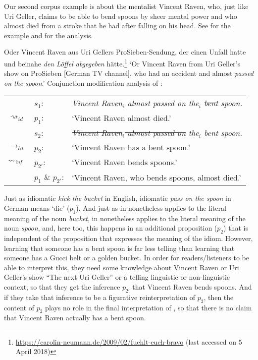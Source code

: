 \documentclass[output=paper]{langsci/langscibook}
\begin{document}
Our second corpus example is about the mentalist Vincent Raven, who, just like Uri Geller, claims to be able to bend spoons by sheer mental power and who almost died from a stroke that he had after falling on his head. See  for the example and  for the analysis.

\ea \label{bent spoon}
Oder Vincent Raven aus Uri Gellers ProSieben-Sendung, der einen Unfall hatte und beinahe \textit{den} \underline{} \textit{Löffel abgegeben} hätte.\footnote{\url{https://carolin-neumann.de/2009/02/fuehlt-euch-bravo} (last accessed on 5 April 2018)}
\glt `Or Vincent Raven from Uri Geller's show on ProSieben [German TV channel], who had an accident and almost \textit{passed on the} \underline{} \textit{spoon}.'
\ex \label{analysis bent spoon} 
Conjunction modification analysis of :\smallskip\\
\begin{tabularx}{\linewidth}[t]{@{}llQ@{}}
 & 	$s_{1}$: &  \textit{Vincent Raven$_{i}$ almost passed on the$_{i}$ \sout{bent} spoon.} \\
$\rightsquigarrow_{id}$	&	$p_{1}$: &  `Vincent Raven almost died.' \medskip\\
& 	$s_{2}$: &  \textit{\sout{Vincent Raven$_{i}$ almost passed on} the$_{i}$ bent spoon.} \\
$\rightarrow_{lit}$ &	$p_{2}$: & `Vincent Raven has a bent spoon.' \\
$\rightsquigarrow_{\text{\itshape inf}}$	&	$p_{2'}$: & `Vincent Raven bends spoons.' \medskip\\
&	$p_{1}$ \& $p_{2'}$: & `Vincent Raven, who bends spoons, almost died.'
\end{tabularx}
\z

\noindent Just as idiomatic \textit{kick the bucket} in English, idiomatic \textit{pass on the spoon} in German means `die' ($p_{1}$). And just as \underline{} in  nonetheless applies to the literal meaning of the noun \textit{bucket}, \underline{} in  nonetheless applies to the literal meaning of the noun \textit{spoon}, and, here too, this happens in an additional proposition ($p_{2}$) that is independent of the proposition that expresses the meaning of the idiom. However, learning that someone has a bent spoon is far less telling than learning that someone has a Gucci belt or a golden bucket. In order for readers/listeners to be able to interpret this, they need some knowledge about Vincent Raven or Uri Geller's show ``The next Uri Geller'' or a telling linguistic or non-linguistic context, so that they get the inference $p_{2'}$ that Vincent Raven bends spoons. And if they take that inference to be a figurative reinterpretation of $p_{2}$, then the content of $p_{2}$ plays no role in the final interpretation of , so that there is no claim that Vincent Raven actually has a bent spoon.
\end{document}
